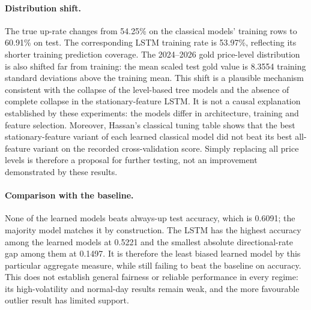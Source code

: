 \paragraph{Distribution shift.}
The true up-rate changes from 54.25\% on the classical models' training rows to 60.91\% on test. The corresponding LSTM training rate is 53.97\%, reflecting its shorter training prediction coverage. The 2024--2026 gold price-level distribution is also shifted far from training: the mean scaled test gold value is 8.3554 training standard deviations above the training mean. This shift is a plausible mechanism consistent with the collapse of the level-based tree models and the absence of complete collapse in the stationary-feature LSTM. It is not a causal explanation established by these experiments: the models differ in architecture, training and feature selection. Moreover, Hassan's classical tuning table shows that the best stationary-feature variant of each learned classical model did not beat its best all-feature variant on the recorded cross-validation score. Simply replacing all price levels is therefore a proposal for further testing, not an improvement demonstrated by these results.

\paragraph{Comparison with the baseline.}
None of the learned models beats always-up test accuracy, which is 0.6091; the majority model matches it by construction. The LSTM has the highest accuracy among the learned models at 0.5221 and the smallest absolute directional-rate gap among them at 0.1497. It is therefore the least biased learned model by this particular aggregate measure, while still failing to beat the baseline on accuracy. This does not establish general fairness or reliable performance in every regime: its high-volatility and normal-day results remain weak, and the more favourable outlier result has limited support.

